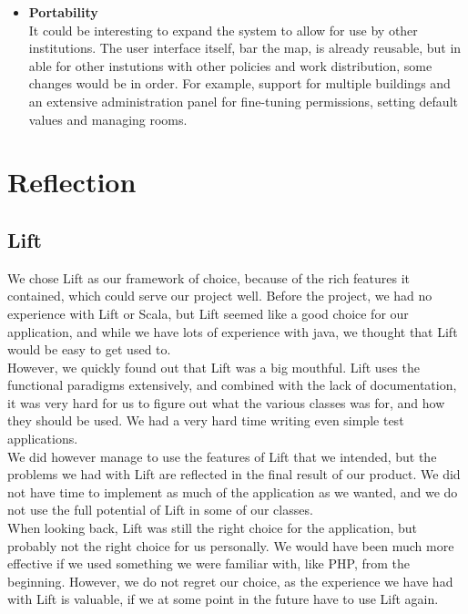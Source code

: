 \begin{itemize}
	\item \textbf{Portability}\\
	It could be interesting to expand the system to allow for use by other institutions. The user interface itself, bar the map, is already reusable, but in able for other instutions with other policies and work distribution, some changes would be in order. For example, support for multiple buildings and an extensive administration panel for fine-tuning permissions, setting default values and managing rooms.
\end{itemize}

\section{Reflection}
\label{sec:reflection}

\subsection{Lift}
We chose Lift as our framework of choice, because of the rich features it contained, which could serve our project well. Before the project, we had no experience with Lift or Scala, but Lift seemed like a good choice for our application, and while we have lots of experience with java, we thought that Lift would be easy to get used to.\\
However, we quickly found out that Lift was a big mouthful. Lift uses the functional paradigms extensively, and combined with the lack of documentation, it was very hard for us to figure out what the various classes was for, and how they should be used. We had a very hard time writing even simple test applications.\\
We did however manage to use the features of Lift that we intended, but the problems we had with Lift are reflected in the final result of our product. We did not have time to implement as much of the application as we wanted, and we do not use the full potential of Lift in some of our classes. \\

When looking back, Lift was still the right choice for the application, but probably not the right choice for us personally. We would have been much more effective if we used something we were familiar with, like PHP, from the beginning. However, we do not regret our choice, as the experience we have had with Lift is valuable, if we at some point in the future have to use Lift again.

